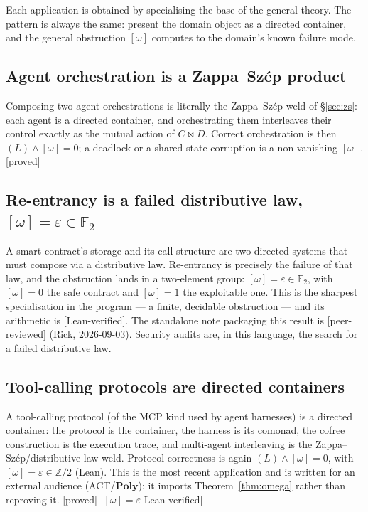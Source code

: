 \documentclass[11pt]{article}
\theoremstyle{plain}
\theoremstyle{definition}
\theoremstyle{remark}
\newcommand{\Poly}{\mathbf{Poly}}
\newcommand{\bowtiemap}{\bowtie}
\newcommand{\omegacl}{[\omega]}
\newcommand{\grade}[1]{{\small\textsf{[#1]}}}
\newcommand{\gReviewed}{\grade{peer-reviewed}}   %
\newcommand{\gLean}{\grade{Lean-verified}}
\newcommand{\gProved}{\grade{proved}}
\begin{document}
Each application is obtained by specialising the base of the general theory. The pattern
is always the same: present the domain object as a directed container, and the general
obstruction $\omegacl$ computes to the domain's known failure mode.

\subsection{Agent orchestration is a Zappa--Sz\'ep product}\label{sec:orch}
Composing two agent orchestrations is literally the Zappa--Sz\'ep weld of
\S\ref{sec:zs}: each agent is a directed container, and orchestrating them interleaves
their control exactly as the mutual action of $C \bowtiemap D$. Correct orchestration is
then $(L) \wedge \omegacl=0$; a deadlock or a shared-state corruption is a non-vanishing
$\omegacl$. \gProved{}

\subsection{Re-entrancy is a failed distributive law, $\omegacl = \varepsilon \in
\mathbb{F}_2$}\label{sec:reentrancy}
A smart contract's storage and its call structure are two directed systems that must
compose via a distributive law. Re-entrancy is precisely the failure of that law, and the
obstruction lands in a two-element group: $\omegacl = \varepsilon \in \mathbb{F}_2$, with
$\omegacl = 0$ the safe contract and $\omegacl = 1$ the exploitable one. This is the
sharpest specialisation in the program --- a finite, decidable obstruction --- and its
arithmetic is \gLean{}. The standalone note packaging this result is \gReviewed{} (Rick,
2026-09-03). Security audits are, in this language, the search for a failed distributive
law.

\subsection{Tool-calling protocols are directed containers}\label{sec:mcp}
A tool-calling protocol (of the MCP kind used by agent harnesses) is a directed container:
the protocol is the container, the harness is its comonad, the cofree construction is the
execution trace, and multi-agent interleaving is the Zappa--Sz\'ep/distributive-law weld.
Protocol correctness is again $(L) \wedge \omegacl = 0$, with $\omegacl = \varepsilon \in
\mathbb{Z}/2$ (Lean). This is the most recent application and is written for an external
audience (ACT/$\Poly$); it imports Theorem~\ref{thm:omega} rather than reproving it.
\gProved{} \grade{$\omegacl=\varepsilon$ Lean-verified}
\end{document}

